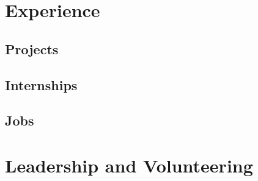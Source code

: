 \documentclass[letterpaper, 11pt]{moderncv}
\begin{document}
	\begin{resume}
		\section{Experience}
			\subsection{\textbf{Projects}}
				
				
			\subsection{\textbf{Internships}}
				
			\subsection{\textbf{Jobs}}
				
				
		\section{Leadership and Volunteering}
			
			
	\end{resume}
\end{document}
